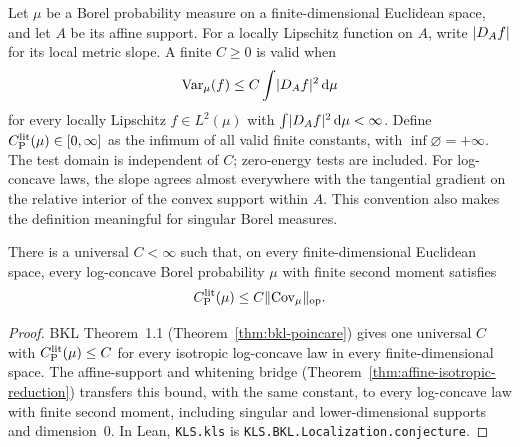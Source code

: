 \begin{definition}
  \label{def:literature-poincare-constant}
  \leanok
  Let $\mu$ be a Borel probability measure on a finite-dimensional Euclidean space, and let $A$
  be its affine support.  For a locally Lipschitz function on $A$, write $\lvert D_Af\rvert$ for its local
  metric slope.  A finite $C\ge0$ is valid when
  \[
    \operatorname{Var}_\mu(f)\le C\int \lvert D_Af\rvert^{2}\,\mathrm d\mu
  \]
  for every locally Lipschitz $f\in L^2(\mu)$ with
  $\int\lvert D_Af\rvert^2\,\mathrm d\mu<\infty$.  Define $C_{\mathrm P}^{\mathrm{lit}}(\mu)\in[0,\infty]$ as the infimum of all
  valid finite constants, with $\inf\varnothing=+\infty$.  The test domain is independent of
  $C$; zero-energy tests are included.  For log-concave laws,
  the slope agrees almost everywhere with the tangential gradient on the relative interior of the
  convex support within $A$.  This convention also makes the definition meaningful for singular
  Borel measures.
\end{definition}

\begin{conjecture}
  \label{conj:kls}
  \leanok
  There is a universal $C<\infty$ such that, on every finite-dimensional Euclidean space, every
  log-concave Borel probability $\mu$ with finite second moment satisfies
  \[
    C_{\mathrm P}^{\mathrm{lit}}(\mu)\le C\lVert\operatorname{Cov}_\mu\rVert_{\mathrm{op}}.
  \]
\end{conjecture}
\begin{proof}
  \leanok
  BKL Theorem~1.1 (Theorem~\ref{thm:bkl-poincare}) gives one universal $C$ with $C_{\mathrm P}^{\mathrm{lit}}(\mu)\le C$ for every isotropic
  log-concave law in every finite-dimensional space. The affine-support and whitening bridge
  (Theorem~\ref{thm:affine-isotropic-reduction}) transfers this bound, with the same constant, to every log-concave law
  with finite second moment, including singular and lower-dimensional supports and dimension~$0$. In Lean,
  \texttt{KLS.kls} is \texttt{KLS.BKL.Localization.conjecture}.
\end{proof}


